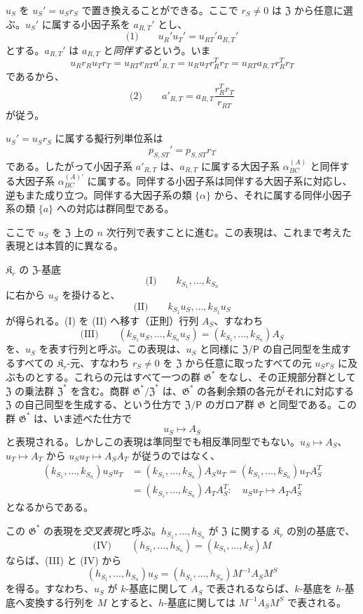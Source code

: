 \(u_S\) を \(u_S'=u_Sr_S\) で置き換えることができる。ここで \(r_S\neq 0\) は \(\mathfrak Z\) から任意に選ぶ。\(u_S'\) に属する小因子系を \(a_{R,T}'\) とし、
\[
\text{(1)}\qquad u_R'u_T'=u_{RT}'a_{R,T}'
\]
とする。\(a_{R,T}'\) は \(a_{R,T}\) と\emph{同伴する}という。いま
\[
u_R r_R u_T r_T=u_{RT}r_{RT}a'_{R,T}
=u_Ru_T r_R^T r_T=u_{RT}a_{R,T}r_R^T r_T
\]
であるから、
\[
\text{(2)}\qquad a'_{R,T}=a_{R,T}\frac{r_R^T r_T}{r_{RT}}
\]
が従う。

\(u_S'=u_Sr_S\) に属する擬行列単位系は
\[
p_{S,ST}'=p_{S,ST}r_T
\]
である。したがって小因子系 \(a'_{R,T}\) は、\(a_{R,T}\) に属する大因子系 \(\alpha_{BC}^{(A)}\) と同伴する大因子系 \(\alpha_{BC}^{(A)\prime}\) に属する。同伴する小因子系は同伴する大因子系に対応し、逆もまた成り立つ。同伴する大因子系の類 \(\{\alpha\}\) から、それに属する同伴小因子系の類 \(\{a\}\) への対応は群同型である。

ここで \(u_S\) を \(\mathfrak Z\) 上の \(n\) 次行列で表すことに進む。この表現は、これまで考えた表現とは本質的に異なる。

\(\mathfrak K_r\) の \(\mathfrak Z\)-基底
\[
\text{(I)}\qquad k_{S_1},\ldots,k_{S_n}
\]
に右から \(u_S\) を掛けると、
\[
\text{(II)}\qquad k_{S_1}u_S, \ldots, k_{S_1}u_S
\]
が得られる。(I) を (II) へ移す（正則）行列 \(A_S\)、すなわち
\[
\text{(III)}\qquad
(k_{S_1}u_S,\ldots,k_{S_n}u_S)
=(k_{S_1},\ldots,k_{S_n})A_S
\]
を、\(u_S\) を表す行列と呼ぶ。この表現は、\(u_S\) と同様に \(\mathfrak Z/\mathsf P\) の自己同型を生成するすべての \(\mathfrak K_r\)-元、すなわち \(r_S\ne0\) を \(\mathfrak Z\) から任意に取ったすべての元 \(u_Sr_S\) に及ぶものとする。これらの元はすべて一つの群 \(\mathfrak G^*\) をなし、その正規部分群として \(\mathfrak Z\) の乗法群 \(\mathfrak Z^*\) を含む。商群 \(\mathfrak G^*/\mathfrak Z^*\) は、\(\mathfrak G^*\) の各剰余類の各元がそれに対応する \(\mathfrak Z\) の自己同型を生成する、という仕方で \(\mathfrak Z/\mathsf P\) のガロア群 \(\mathfrak G\) と同型である。この群 \(\mathfrak G^*\) は、いま述べた仕方で
\[
u_S\mapsto A_S
\]
と表現される。しかしこの表現は準同型でも相反準同型でもない。\(u_S\mapsto A_S\)、\(u_T\mapsto A_T\) から \(u_Su_T\mapsto A_SA_T\) が従うのではなく、
\[
\begin{aligned}
(k_{S_1},\ldots,k_{S_n})u_Su_T
&=(k_{S_1},\ldots,k_{S_n})A_Su_T
=(k_{S_1},\ldots,k_{S_n})u_TA_S^T\\
&=(k_{S_1},\ldots,k_{S_n})A_TA_S^T:
\quad u_Su_T\mapsto A_TA_S^T
\end{aligned}
\]
となるからである。

この \(\mathfrak G^*\) の表現を\emph{交叉表現}と呼ぶ。\(h_{S_1},\ldots,h_{S_n}\) が \(\mathfrak Z\) に関する \(\mathfrak K_r\) の別の基底で、
\[
\text{(IV)}\qquad
(h_{S_1},\ldots,h_{S_n})=(k_{S_1},\ldots,k_S)M
\]
ならば、(III) と (IV) から
\[
(h_{S_1},\ldots,h_{S_n})u_S
=(h_{S_1},\ldots,h_{S_n})M^{-1}A_SM^S
\]
を得る。すなわち、\(u_S\) が \(k\)-基底に関して \(A_S\) で表されるならば、\(k\)-基底を \(h\)-基底へ変換する行列を \(M\) とすると、\(h\)-基底に関しては \(M^{-1}A_SM^S\) で表される。


